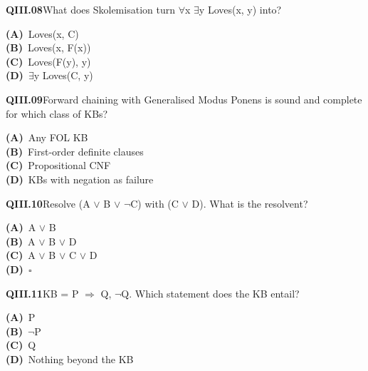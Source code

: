 \documentclass[11pt]{article}
\begin{document}
\begin{tcolorbox}[enhanced,breakable,colback=white,colframe=navyL,arc=2mm,boxrule=0.7pt,left=3mm,right=3mm,top=2mm,bottom=2mm]
\textbf{\color{navy}QIII.08}\quad What does Skolemisation turn $\forall$x $\exists$y Loves(x, y) into?\hfill{}\par\smallskip
{\small \textbf{\color{navyL}(A)}\ Loves(x, C)\\[1pt]\textbf{\color{navyL}(B)}\ Loves(x, F(x))\\[1pt]\textbf{\color{navyL}(C)}\ Loves(F(y), y)\\[1pt]\textbf{\color{navyL}(D)}\ $\exists$y Loves(C, y)}
\end{tcolorbox}
\begin{tcolorbox}[enhanced,breakable,colback=white,colframe=navyL,arc=2mm,boxrule=0.7pt,left=3mm,right=3mm,top=2mm,bottom=2mm]
\textbf{\color{navy}QIII.09}\quad Forward chaining with Generalised Modus Ponens is sound and complete for which class of KBs?\hfill{}\par\smallskip
{\small \textbf{\color{navyL}(A)}\ Any FOL KB\\[1pt]\textbf{\color{navyL}(B)}\ First-order definite clauses\\[1pt]\textbf{\color{navyL}(C)}\ Propositional CNF\\[1pt]\textbf{\color{navyL}(D)}\ KBs with negation as failure}
\end{tcolorbox}
\begin{tcolorbox}[enhanced,breakable,colback=white,colframe=navyL,arc=2mm,boxrule=0.7pt,left=3mm,right=3mm,top=2mm,bottom=2mm]
\textbf{\color{navy}QIII.10}\quad Resolve (A $\vee$ B $\vee$ $\neg$C) with (C $\vee$ D). What is the resolvent?\hfill{}\par\smallskip
{\small \textbf{\color{navyL}(A)}\ A $\vee$ B\\[1pt]\textbf{\color{navyL}(B)}\ A $\vee$ B $\vee$ D\\[1pt]\textbf{\color{navyL}(C)}\ A $\vee$ B $\vee$ C $\vee$ D\\[1pt]\textbf{\color{navyL}(D)}\ $\square$}
\end{tcolorbox}
\begin{tcolorbox}[enhanced,breakable,colback=white,colframe=navyL,arc=2mm,boxrule=0.7pt,left=3mm,right=3mm,top=2mm,bottom=2mm]
\textbf{\color{navy}QIII.11}\quad KB = {P $\Rightarrow$ Q, $\neg$Q}. Which statement does the KB entail?\hfill{}\par\smallskip
{\small \textbf{\color{navyL}(A)}\ P\\[1pt]\textbf{\color{navyL}(B)}\ $\neg$P\\[1pt]\textbf{\color{navyL}(C)}\ Q\\[1pt]\textbf{\color{navyL}(D)}\ Nothing beyond the KB}
\end{tcolorbox}
\end{document}
